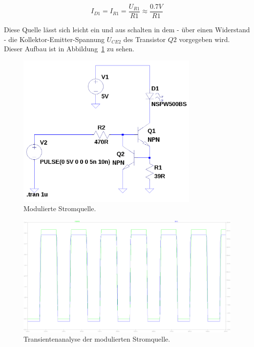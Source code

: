 \documentclass[12pt,a4paper]{article}
\begin{document}
\begin{equation}
I_{D1} = I_{R1} = \frac{U_{R1}}{R1} \approx \frac{0.7V}{R1}
\end{equation}

Diese Quelle lässt sich leicht ein und aus schalten in dem - über einen Widerstand - die Kollektor-Emitter-Spannung $U_{CE2}$ des Transistor $Q2$ vorgegeben wird. Dieser Aufbau ist in Abbildung~\ref{fig:modulated_current_source} zu sehen.

\begin{figure}[h!]
  \centering
    \includegraphics[width=0.8\textwidth]{../spice/modulated_current_source.png}
  \caption{Modulierte Stromquelle.}
  \label{fig:modulated_current_source}
\end{figure}

\begin{figure}[h!]
  \centering
    \includegraphics[width=1.0\textwidth]{../spice/current_input_v_current_out_trans.png}
  \caption{Transientenanalyse der modulierten Stromquelle.}
  \label{fig:modulated_current_source_plot}
\end{figure}
\end{document}
